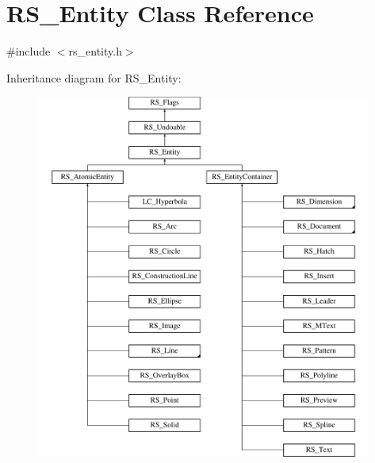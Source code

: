 \hypertarget{classRS__Entity}{\section{R\-S\-\_\-\-Entity Class Reference}
\label{classRS__Entity}
}


{\ttfamily \#include $<$rs\-\_\-entity.\-h$>$}

Inheritance diagram for R\-S\-\_\-\-Entity\-:\begin{figure}[H]
\begin{center}
\leavevmode
\includegraphics[height=12.000000cm]{classRS__Entity}
\end{center}
\end{figure}
